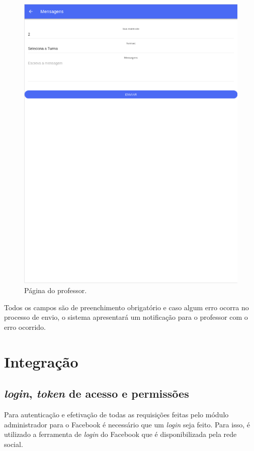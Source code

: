 \begin{figure}[H]
\centering
\includegraphics[scale=0.5]{figuras/mobile2}
\caption{Página do professor.}
\label{fig:mobile3}
\end{figure}

Todos os campos são de preenchimento obrigatório e caso algum erro ocorra no processo de envio, o sistema apresentará um notificação para o professor com o erro ocorrido.

\section{Integração}
\subsection{\textit{login}, \textit{token} de acesso e permissões}
Para autenticação e efetivação de todas as requisições feitas pelo módulo administrador para o Facebook é necessário que um \textit{login} seja feito. Para isso, é utilizado a ferramenta de \textit{login} do Facebook que é disponibilizada pela rede social.

